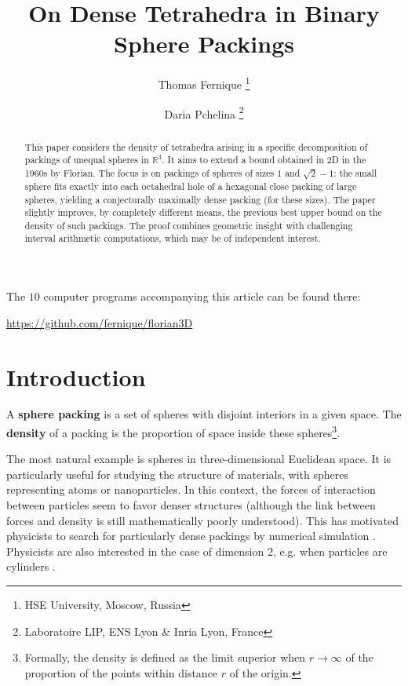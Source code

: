 \documentclass[11pt]{article}
\title{On Dense Tetrahedra in Binary Sphere Packings}
\author{
Thomas Fernique
\footnote{HSE University, Moscow, Russia}
\and
Daria Pchelina
\footnote{Laboratoire LIP, ENS Lyon \& Inria Lyon, France}
}
\begin{document}
\maketitle

\begin{abstract}
This paper considers the density of tetrahedra arising in a specific decomposition of packings of unequal spheres in $\mathbb{R}^3$.
It aims to extend a bound obtained in 2D in the 1960s by Florian. The focus is on packings of spheres of sizes $1$ and $\sqrt{2}-1$: the small sphere fits exactly into each octahedral hole of a hexagonal close packing of large spheres, yielding a conjecturally maximally dense packing (for these sizes).
The paper slightly improves, by completely different means, the previous best upper bound on the density of such packings.
The proof combines geometric insight with challenging interval arithmetic computations, which may be of independent interest.
\end{abstract}


\noindent The $10$ computer programs accompanying this article can be found there:
\begin{center}
\url{https://github.com/fernique/florian3D}
\end{center}

\section{Introduction}

A {\bf sphere packing} is a set of spheres with disjoint interiors in a given space.
The {\bf density} of a packing is the proportion of space inside these spheres\footnote{Formally, the density is defined as the limit superior when $r\to\infty$ of the proportion of the points within distance $r$ of the origin.}.

The most natural example is spheres in three-dimensional Euclidean space.
It is particularly useful for studying the structure of materials, with spheres representing atoms or nanoparticles.
In this context, the forces of interaction between particles seem to favor denser structures (although the link between forces and density is still mathematically poorly understood).
This has motivated physicists to search for particularly dense packings by numerical simulation \cite{HO11,HST12}.
Physicists are also interested in the case of dimension 2, e.g. when particles are cylinders \cite{LH93,FJFS20}.
\end{document}

